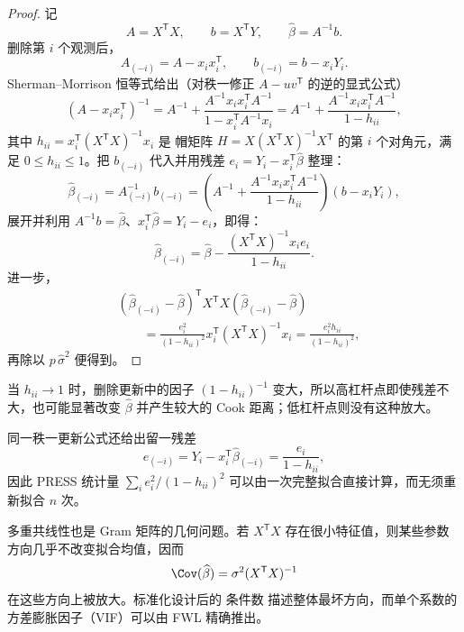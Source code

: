 \begin{proof}
记
\[
 A=X^{\mathsf T}X,
 \qquad
 b=X^{\mathsf T}Y,
 \qquad
 \widehat\beta=A^{-1}b.
\]
删除第 $i$ 个观测后，
\[
 A_{(-i)}=A-x_ix_i^{\mathsf T},
 \qquad
 b_{(-i)}=b-x_iY_i.
\]
Sherman--Morrison 恒等式给出（对秩一修正 $A-uv^{\mathsf T}$ 的逆的显式公式）
\[
 (A-x_ix_i^{\mathsf T})^{-1}
 =A^{-1}
 +\frac{A^{-1}x_ix_i^{\mathsf T}A^{-1}}
 {1-x_i^{\mathsf T}A^{-1}x_i}
 =A^{-1}
 +\frac{A^{-1}x_ix_i^{\mathsf T}A^{-1}}{1-h_{ii}},
\]
其中 $h_{ii}=x_i^{\mathsf T}(X^{\mathsf T}X)^{-1}x_i$ 是 帽矩阵 $H=X(X^{\mathsf T}X)^{-1}X^{\mathsf T}$ 的第 $i$ 个对角元，满足 $0\le h_{ii}\le1$。把 $b_{(-i)}$ 代入并用残差 $e_i=Y_i-x_i^{\mathsf T}\widehat\beta$ 整理：
\[
\widehat\beta_{(-i)}
=A_{(-i)}^{-1}b_{(-i)}
=\left(A^{-1}+\frac{A^{-1}x_ix_i^{\mathsf T}A^{-1}}{1-h_{ii}}\right)(b-x_iY_i),
\]
展开并利用 $A^{-1}b=\widehat\beta$、$x_i^{\mathsf T}\widehat\beta=Y_i-e_i$，即得：
\[
\widehat\beta_{(-i)}=\widehat\beta-\frac{(X^{\mathsf T}X)^{-1}x_i e_i}{1-h_{ii}}.
\]
进一步，
\begin{align*}
 &(\widehat\beta_{(-i)}-\widehat\beta)^{\mathsf T}
 X^{\mathsf T}X
 (\widehat\beta_{(-i)}-\widehat\beta)\\
 &\qquad
 =\frac{e_i^2}{(1-h_{ii})^2}
 x_i^{\mathsf T}(X^{\mathsf T}X)^{-1}x_i
 =\frac{e_i^2h_{ii}}{(1-h_{ii})^2},
\end{align*}
再除以 $p\,\widehat\sigma^2$ 便得到。
\end{proof}

\begin{note}[高杠杆放大与留一预测]
当 $h_{ii}\to1$ 时，删除更新中的因子 $(1-h_{ii})^{-1}$ 变大，所以高杠杆点即使残差不大，也可能显著改变 $\widehat\beta$ 并产生较大的 Cook 距离；低杠杆点则没有这种放大。

同一秩一更新公式还给出留一残差
\[
e_{(-i)}=Y_i-x_i^{\mathsf T}\widehat\beta_{(-i)}=\frac{e_i}{1-h_{ii}},
\]
因此 PRESS 统计量 $\sum_i e_i^2/(1-h_{ii})^2$ 可以由一次完整拟合直接计算，而无须重新拟合 $n$ 次。
\end{note}

多重共线性也是 Gram 矩阵的几何问题。若 $X^{\mathsf T}X$ 存在很小特征值，则某些参数方向几乎不改变拟合均值，因而
\[
 \Cov(\widehat\beta)=\sigma^2(X^{\mathsf T}X)^{-1}
\]
在这些方向上被放大。标准化设计后的 条件数 描述整体最坏方向，而单个系数的 方差膨胀因子（VIF）可以由 FWL 精确推出。

